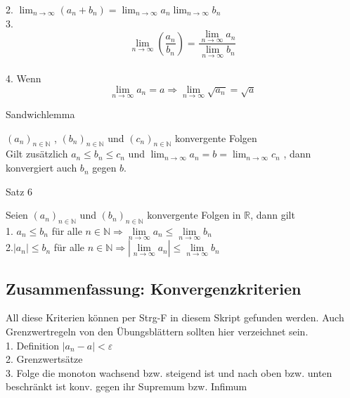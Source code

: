 \documentclass[headsepline,12pt,a4paper]{scrartcl}
\begin{document}
2. $\lim_{n \rightarrow \infty} (a_n + b_n) = \lim_{n \rightarrow \infty} a_n \lim_{n \rightarrow \infty} b_n $ \\

3. $$ \lim_{n \rightarrow \infty} ( \frac{a_n}{b_n}) = \frac{\lim_{n \rightarrow \infty} a_n}{\lim_{n \rightarrow \infty} b_n}$$ \\

4. Wenn $$\lim\limits_{n \rightarrow \infty} a_n = a \Rightarrow \lim\limits_{n \rightarrow \infty} \sqrt{a_n} = \sqrt{a} $$

\item[Sandwichlemma]

$(a_n)_{n\in \mathbb{N}}$ , $(b_n)_{n\in \mathbb{N}}$ und $(c_n)_{n\in \mathbb{N}}$ konvergente Folgen \\
Gilt zusätzlich $ a_n \leq b_n \leq c_n $ und $\lim_{n \rightarrow \infty} a_n = b = \lim_{n \rightarrow \infty} c_n $ , dann konvergiert auch 
$b_n$ gegen $b$. \\

\item[Satz 6]

Seien $(a_n)_{n\in \mathbb{N}}$ und $(b_n)_{n\in \mathbb{N}}$ konvergente Folgen in $\mathbb{R}$, dann gilt \\

1. $a_n \leq b_n $ für alle $ n \in \mathbb{N} \Rightarrow \lim\limits_{n \rightarrow \infty} a_n \leq \lim\limits_{n \rightarrow \infty} b_n $ \\

2.$|a_n| \leq b_n $ für alle $ n \in \mathbb{N} \Rightarrow |\lim\limits_{n \rightarrow \infty} a_n | \leq \lim\limits_{n \rightarrow \infty} b_n $ \\

\newpage

\subsection*{Zusammenfassung: Konvergenzkriterien}

All diese Kriterien können per Strg-F in diesem Skript gefunden werden. Auch Grenzwertregeln von den Übungsblättern sollten hier verzeichnet sein.\\

1. Definition $|a_n-a|<\varepsilon$ \\
2. Grenzwertsätze \\
3. Folge die monoton wachsend bzw. steigend ist und nach oben bzw. unten beschränkt ist konv. gegen ihr Supremum bzw. Infimum \\
\end{document}
